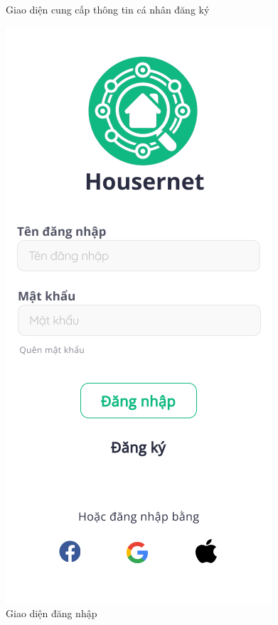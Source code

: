 \begin{figure}[!htb]
\begin{minipage}{0.32\textwidth}
     \caption{Giao diện cung cấp thông tin cá nhân đăng ký}
   \end{minipage}\hfill
   \begin{minipage}{0.32\textwidth}
     \centering
     \includegraphics[width=1\linewidth]{Images/UI figma/Login}
     \caption{Giao diện đăng nhập}
   \end{minipage}
\end{figure}
\newpage
